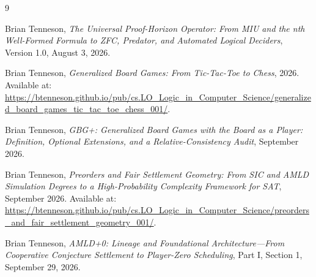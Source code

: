 \documentclass[11pt]{article}
\begin{document}
\begin{thebibliography}{9}

Brian Tenneson,
\emph{The Universal Proof-Horizon Operator: From MIU and the nth Well-Formed
Formula to ZFC, Predator, and Automated Logical Deciders},
Version 1.0, August 3, 2026.

Brian Tenneson,
\emph{Generalized Board Games: From Tic-Tac-Toe to Chess},
2026.
Available at:
\url{https://btenneson.github.io/pub/cs.LO_Logic_in_Computer_Science/generalized_board_games_tic_tac_toe_chess_001/}.

Brian Tenneson,
\emph{GBG+: Generalized Board Games with the Board as a Player: Definition,
Optional Extensions, and a Relative-Consistency Audit},
September 2026.

Brian Tenneson,
\emph{Preorders and Fair Settlement Geometry: From SIC and AMLD Simulation
Degrees to a High-Probability Complexity Framework for SAT},
September 2026.
Available at:
\url{https://btenneson.github.io/pub/cs.LO_Logic_in_Computer_Science/preorders_and_fair_settlement_geometry_001/}.

Brian Tenneson,
\emph{AMLD+0: Lineage and Foundational Architecture---From Cooperative
Conjecture Settlement to Player-Zero Scheduling},
Part I, Section 1, September 29, 2026.

\end{thebibliography}
\end{document}
